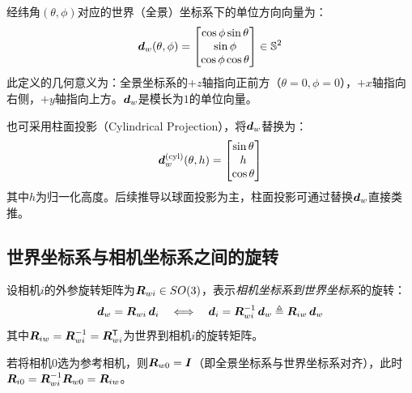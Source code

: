 \begin{definition}[全景坐标系下的单位方向向量]
经纬角$(\theta, \phi)$对应的世界（全景）坐标系下的单位方向向量为：
\begin{equation}
\bm{d}_w(\theta, \phi) =
\begin{bmatrix}
\cos\phi \sin\theta \\
\sin\phi \\
\cos\phi \cos\theta
\end{bmatrix}
\in \mathbb{S}^2
\label{eq:dw}
\end{equation}
此定义的几何意义为：全景坐标系的$+z$轴指向正前方（$\theta=0,\phi=0$），$+x$轴指向右侧，$+y$轴指向上方。$\bm{d}_w$是模长为$1$的单位向量。
\end{definition}

\begin{remark}
也可采用柱面投影（Cylindrical Projection），将$\bm{d}_w$替换为：
\begin{equation}
\bm{d}_w^{\text{(cyl)}}(\theta, h) =
\begin{bmatrix}
\sin\theta \\ h \\ \cos\theta
\end{bmatrix}
\label{eq:dw-cyl}
\end{equation}
其中$h$为归一化高度。后续推导以球面投影为主，柱面投影可通过替换$\bm{d}_w$直接类推。
\end{remark}

\subsection{世界坐标系与相机坐标系之间的旋转}
\label{sec:world-cam-rot}

\begin{definition}[世界到相机的旋转]
设相机$i$的外参旋转矩阵为$\bm{R}_{wi} \in SO(3)$，表示\emph{相机坐标系到世界坐标系}的旋转：
\begin{equation}
\bm{d}_w = \bm{R}_{wi}\,\bm{d}_i
\quad\Longleftrightarrow\quad
\bm{d}_i = \bm{R}_{wi}^{-1}\,\bm{d}_w \triangleq \bm{R}_{iw}\,\bm{d}_w
\label{eq:world-cam-rot}
\end{equation}
其中$\bm{R}_{iw} = \bm{R}_{wi}^{-1} = \bm{R}_{wi}^{\mathsf{T}}$为世界到相机$i$的旋转矩阵。
\end{definition}

若将相机$0$选为参考相机，则$\bm{R}_{w0} = \bm{I}$（即全景坐标系与世界坐标系对齐），此时$\bm{R}_{i0} = \bm{R}_{wi}^{-1} \bm{R}_{w0} = \bm{R}_{iw}$。

